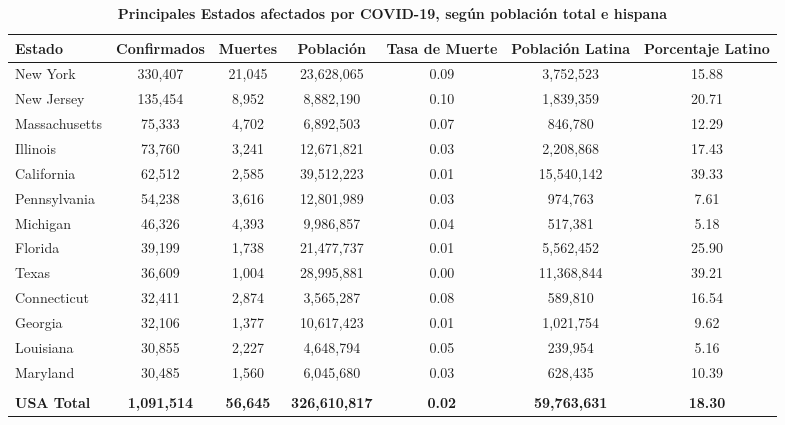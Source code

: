   \begin{table}[H]
	\centering
	\caption{\textbf{Principales Estados afectados por COVID-19, según población total e hispana}}
	\label{Tabla 1}
	\resizebox{17cm}{!} { 
		\begin{tabular}{lcccccc} \toprule			
			\textbf{Estado}	&	\textbf{Confirmados}	&	\textbf{Muertes}	&	\textbf{Población}	&	\textbf{Tasa de Muerte}	&	\textbf{Población Latina}	&	\textbf{Porcentaje Latino}	\\  \midrule
			New York	&	330,407	&	21,045	&	23,628,065	&	0.09	&	3,752,523	&	15.88	\\ 
			New Jersey	&	135,454	&	8,952	&	8,882,190	&	0.10	&	1,839,359	&	20.71	\\ 
			Massachusetts	&	75,333	&	4,702	&	6,892,503	&	0.07	&	846,780	&	12.29	\\ 
			Illinois	&	73,760	&	3,241	&	12,671,821	&	0.03	&	2,208,868	&	17.43	\\ 
			California	&	62,512	&	2,585	&	39,512,223	&	0.01	&	15,540,142	&	39.33	\\ 
			Pennsylvania	&	54,238	&	3,616	&	12,801,989	&	0.03	&	974,763	&	7.61	\\ 
			Michigan	&	46,326	&	4,393	&	9,986,857	&	0.04	&	517,381	&	5.18	\\ 
			Florida	&	39,199	&	1,738	&	21,477,737	&	0.01	&	5,562,452	&	25.90	\\ 
			Texas	&	36,609	&	1,004	&	28,995,881	&	0.00	&	11,368,844	&	39.21	\\ 
			Connecticut	&	32,411	&	2,874	&	3,565,287	&	0.08	&	589,810	&	16.54	\\ 
			Georgia	&	32,106	&	1,377	&	10,617,423	&	0.01	&	1,021,754	&	9.62	\\ 
			Louisiana	&	30,855	&	2,227	&	4,648,794	&	0.05	&	239,954	&	5.16	\\ 
			Maryland	&	30,485	&	1,560	&	6,045,680	&	0.03	&	628,435	&	10.39	\\ 
			&		&		&		&		&		&		\\ 
			\textbf{USA Total}	&	\textbf{1,091,514}	&	\textbf{56,645}	&	\textbf{326,610,817}	& \textbf{0.02}		&	\textbf{59,763,631}	& \textbf{18.30}		\\  \bottomrule
		

			
		\end{tabular} 
	
	}
	{\small {}}
	
\end{table}

